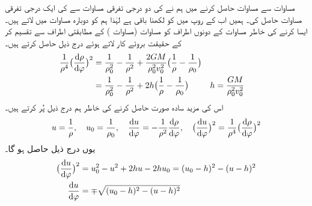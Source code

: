مساوات   سے مساوات   حاصل کرنے میں ہم نے   کی دو درجی  تفرقی مساوات سے   کی ایک درجی تفرقی مساوات حاصل کی۔ ہمیں اب  کے روپ میں  کو  لکھنا باقی ہے   لہٰذا ہم  کو دوبارہ مساوات میں لاتے ہیں۔ایسا کرنے کی خاطر  مساوات   کے دونوں اطراف کو مساوات  (مساوات ) کے مطابقتی اطراف سے تقسیم کر  کے حقیقت
  بروئے کار لاتے ہوئے درج ذیل حاصل کرتے ہیں۔
\begin{align}\label{مساوات_سمتی_تفاعل_کپلر_ثبوت_پہلا_ث}
\frac{1}{\rho^4}\big(\frac{\dif \rho}{\dif\varphi}\big)^2&=\frac{1}{\rho_0^2}-\frac{1}{\rho^2}+\frac{2GM}{\rho_0^2v_0^2}\big(\frac{1}{\rho}-\frac{1}{\rho_0}\big)\\
&=\frac{1}{\rho_0^2}-\frac{1}{\rho^2}+2h\big(\frac{1}{\rho}-\frac{1}{\rho_0}\big)&&h=\frac{GM}{\rho_0^2v_0^2}
\end{align}
اس کی مزید سادہ صورت حاصل کرنے کی خاطر  ہم درج ذیل پُر کرتے ہیں۔
 \begin{align*}
u=\frac{1}{\rho},\quad u_0=\frac{1}{\rho_0},\quad \frac{\dif u}{\dif\varphi}=-\frac{1}{\rho^2}\frac{\dif \rho}{\dif \varphi},\quad \big(\frac{\dif u}{\dif\varphi}\big)^2=\frac{1}{\rho^4}\big(\frac{\dif \rho}{\dif\varphi}\big)^2
\end{align*}
یوں  درج ذیل حاصل ہو گا۔
\begin{align}
\big(\frac{\dif u}{\dif\varphi}\big)^2&=u_0^2-u^2+2hu-2hu_0=(u_0-h)^2-(u-h)^2\label{مساوات_سمتی_تفاعل_کپلر_ثبوت_پہلا_ج}\\
\frac{\dif u}{\dif \varphi}&=\mp\sqrt{(u_0-h)^2-(u-h)^2}\label{مساوات_سمتی_تفاعل_کپلر_ثبوت_پہلا_چ}
\end{align}

